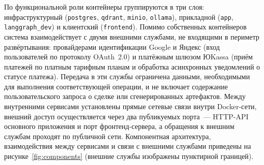 По функциональной роли контейнеры группируются в три слоя: инфраструктурный (\texttt{postgres}, \texttt{qdrant}, \texttt{minio}, \texttt{ollama}), прикладной (\texttt{app}, \texttt{langgraph\_dev}) и клиентский (\texttt{frontend}). Помимо собственных контейнеров система взаимодействует с двумя внешними службами, не входящими в периметр развёртывания: провайдерами идентификации Google и Яндекс (вход пользователей по протоколу OAuth~2.0) и платёжным шлюзом ЮKassa (приём платежей по платным тарифным планам и обработка асинхронных уведомлений о статусе платежа). Передача в эти службы ограничена данными, необходимыми для выполнения соответствующей операции, и не включает содержание пользовательского запроса о сделке или сгенерированных артефактов. Между внутренними сервисами установлены прямые сетевые связи внутри Docker-сети, внешний доступ осуществляется через два публикуемых порта~--- HTTP-API основного приложения и порт фронтенд-сервера, а обращения к внешним службам проходят по публичной сети. Компонентная архитектура, взаимодействия между сервисами и связи с внешними службами приведены на рисунке~\ref{fig:components} (внешние службы изображены пунктирной границей).

